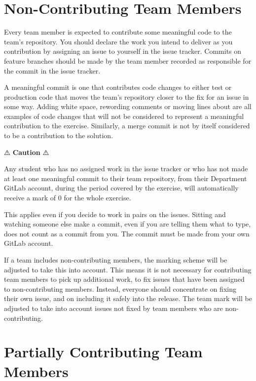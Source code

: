 \documentclass[
]{book}
\begin{document}
\hypertarget{passengers}{%
\section{Non-Contributing Team Members}\label{passengers}}

Every team member is expected to contribute some meaningful code to the team's repository. You should declare the work you intend to deliver as you contribution by assigning an issue to yourself in the issue tracker. Commits on feature branches should be made by the team member recorded as responsible for the commit in the issue tracker.

A meaningful commit is one that contributes code changes to either test or production code that moves the team's repository closer to the fix for an issue in some way. Adding white space, rewording comments or moving lines about are all examples of code changes that will not be considered to represent a meaningful contribution to the exercise. Similarly, a merge commit is not by itself considered to be a contribution to the solution.

⚠️ \textbf{Caution} ⚠️

Any student who has no assigned work in the issue tracker or who has not made at least one meaningful commit to their team repository, from their Department GitLab account, during the period covered by the exercise, will automatically receive a mark of 0 for the whole exercise.

This applies even if you decide to work in pairs on the issues. Sitting and watching someone else make a commit, even if you are telling them what to type, does not count as a commit from you. The commit must be made from your own GitLab account.

If a team includes non-contributing members, the marking scheme will be adjusted to take this into account. This means it is not necessary for contributing team members to pick up additional work, to fix issues that have been assigned to non-contributing members. Instead, everyone should concentrate on fixing their own issue, and on including it safely into the release. The team mark will be adjusted to take into account issues not fixed by team members who are non-contributing.

\hypertarget{freeriders}{%
\section{Partially Contributing Team Members}\label{freeriders}}
\end{document}

